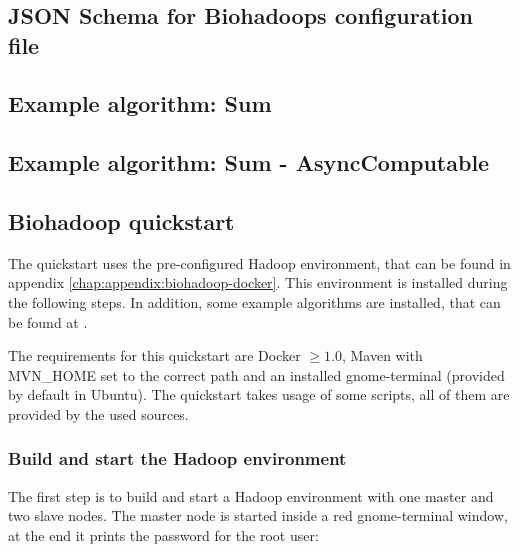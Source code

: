 \appendix
\addappheadtotoc

\chapter{}

\section{JSON Schema for Biohadoops configuration file}


\section{Example algorithm: Sum}


\section{Example algorithm: Sum - AsyncComputable}


\section{Biohadoop quickstart}
\label{chap:appendix:biohadoop-quickstart}
The quickstart uses the pre-configured Hadoop environment, that can be found in appendix \ref{chap:appendix:biohadoop-docker}. This environment is installed during the following steps. In addition, some example algorithms are installed, that can be found at \cite{biohadoop-algorithms}. 

The requirements for this quickstart are Docker $\geq 1.0$, Maven with MVN\_HOME set to the correct path and an installed gnome-terminal (provided by default in Ubuntu). The quickstart takes usage of some scripts, all of them are provided by the used sources.

\subsection{Build and start the Hadoop environment}
The first step is to build and start a Hadoop environment with one master and two slave nodes. The master node is started inside a red gnome-terminal window, at the end it prints the password for the root user:

